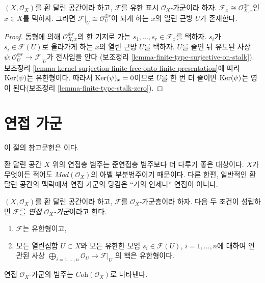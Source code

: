 \begin{lemma}
\label{lemma-finite-presentation-stalk-free}
$(X, \mathcal{O}_X)$를 환 달린 공간이라 하고, $\mathcal{F}$를
유한 표시 $\mathcal{O}_X$-가군이라 하자.
$\mathcal{F}_x \cong \mathcal{O}_{X, x}^{\oplus r}$인 $x \in X$를 택하자.
그러면 $\mathcal{F}|_U \cong \mathcal{O}_U^{\oplus r}$이 되게 하는
$x$의 열린 근방 $U$가 존재한다.
\end{lemma}

\begin{proof}
동형에 의해 $\mathcal{O}_{X, x}^{\oplus r}$의 한 기저로 가는
$s_1, \ldots, s_r \in \mathcal{F}_x$를 택하자.
$s_i$가 $s_i \in \mathcal{F}(U)$로 올라가게 하는 $x$의 열린 근방 $U$를 택하자.
$U$를 줄인 뒤 유도된 사상
$\psi : \mathcal{O}_U^{\oplus r} \to \mathcal{F}|_U$가 전사임을 안다
(보조정리 \ref{lemma-finite-type-surjective-on-stalk}).
보조정리 \ref{lemma-kernel-surjection-finite-free-onto-finite-presentation}에 따라
$\mathop{\mathrm{Ker}}(\psi)$는 유한형이다.
따라서 $\mathop{\mathrm{Ker}}(\psi)_x = 0$이므로 $U$를 한 번 더 줄이면
$\mathop{\mathrm{Ker}}(\psi)$는 영이 된다(보조정리 \ref{lemma-finite-type-stalk-zero}).
\end{proof}





\section{연접 가군}
\label{section-coherent}

\noindent
이 절의 참고문헌은 \cite{FAC}이다.

\medskip\noindent
환 달린 공간 $X$ 위의 연접층 범주는 준연접층 범주보다
더 다루기 좋은 대상이다. $X$가 무엇이든 적어도
$\textit{Mod}(\mathcal{O}_X)$의 아벨 부분범주이기 때문이다.
다른 한편, 일반적인 환 달린 공간의 맥락에서 연접 가군의 당김은
“거의 언제나” 연접이 아니다.

\begin{definition}
\label{definition-coherent}
$(X, \mathcal{O}_X)$를 환 달린 공간이라 하고,
$\mathcal{F}$를 $\mathcal{O}_X$-가군층이라 하자.
다음 두 조건이 성립하면 $\mathcal{F}$를
{\it 연접 $\mathcal{O}_X$-가군}이라고 한다.
\begin{enumerate}
\item $\mathcal{F}$는 유한형이고,
\item 모든 열린집합 $U \subset X$와 모든 유한한 모임
$s_i \in \mathcal{F}(U)$, $i = 1, \ldots, n$에 대하여 연관된 사상
$\bigoplus_{i = 1, \ldots, n} \mathcal{O}_U \to \mathcal{F}|_U$
의 핵은 유한형이다.
\end{enumerate}
연접 $\mathcal{O}_X$-가군의 범주는
$\textit{Coh}(\mathcal{O}_X)$로 나타낸다.
\end{definition}

